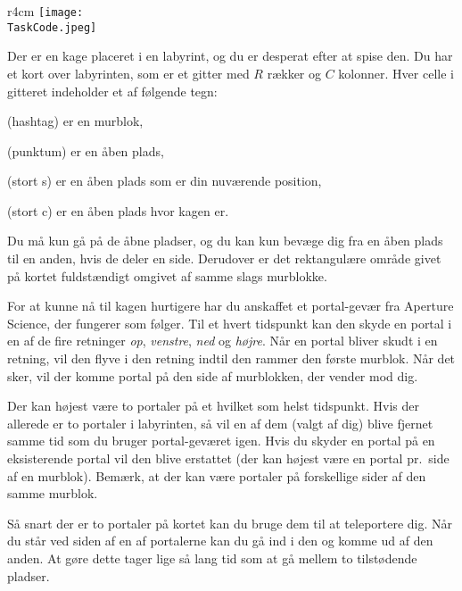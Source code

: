 \documentclass{boi2014-dk}
\renewcommand{\TaskCode}{portals}
\newcommand{\constant}[1]{{\tt #1}}
\begin{document}
    \begin{wrapfigure}[4]{r}{4cm}
        \vspace{-24pt}
		\texttt{[image: \\TaskCode.jpeg]}
	\end{wrapfigure}

    Der er en kage placeret i en labyrint, og du er desperat efter at spise
    den. Du har et kort over labyrinten, som er et gitter med $R$ rækker og $C$
    kolonner. Hver celle i gitteret indeholder et af følgende tegn:
    \begin{description}[itemindent=1pt]
    	\item[\constant{\#}] (hashtag) er en murblok,
        \item[\constant{.}] (punktum) er en åben plads,
        \item[\constant{S}] (stort s) er en åben plads som er din
            nuværende position,
        \item[\constant{C}] (stort c) er en åben plads hvor kagen er.
    \end{description}

    Du må kun gå på de åbne pladser, og du kan kun bevæge dig fra en åben plads
    til en anden, hvis de deler en side. Derudover er det rektangulære område
    givet på kortet fuldstændigt omgivet af samme slags murblokke.

    For at kunne nå til kagen hurtigere har du anskaffet et portal-gevær
    fra Aperture Science\texttrademark{}, der fungerer som følger.
    Til et hvert tidspunkt kan den skyde en portal i en af de fire retninger
    \emph{op}, \emph{venstre}, \emph{ned} og \emph{højre}. Når en portal bliver
    skudt i en retning, vil den flyve i den retning indtil den rammer den første
    murblok. Når det sker, vil der komme portal på den side af murblokken,
    der vender mod dig.

    Der kan højest være to portaler på et hvilket som helst tidspunkt. Hvis der
    allerede er to portaler i labyrinten, så vil en af dem (valgt af dig) blive
    fjernet samme tid som du bruger portal-geværet igen. Hvis du skyder en
    portal på en eksisterende portal vil den blive erstattet
    (der kan højest være en portal pr.~side af en murblok). Bemærk, at der
    kan være portaler på forskellige sider af den samme murblok.

    Så snart der er to portaler på kortet kan du bruge dem til at teleportere
    dig. Når du står ved siden af en af portalerne kan du gå ind i den og komme
    ud af den anden. At gøre dette tager lige så lang tid som at gå mellem to
    tilstødende pladser.
\end{document}
